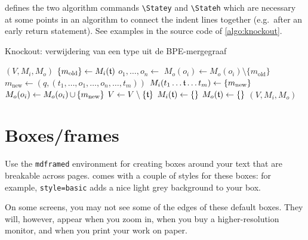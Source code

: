 \repo defines the two algorithm commands \verb|\Statey| and \verb|\Stateh| which are necessary at some points in an algorithm to connect the indent lines together (e.g.\ after an early return statement). See examples in the source code of \autoref{algo:knockout}.
\begin{algorithm}[H]
	\caption{Knockout: verwijdering van een type uit de BPE-mergegraaf}
	\label{algo:knockout}
	\begin{algorithmic}[1]
			 
				\State\Return $(V, M_i, M_o)$
			\EndIf
			\Statey $\{m_\text{old}\} \gets M_i(\mathfrak{t})$
			\State $o_1,\hdots, o_n \gets$ 
				\State $M_o(o_i) \gets M_o(o_i) \setminus \{m_\text{old}\}$  
			\EndFor \vspace{-0.22em}
				\State $m_\text{new} \gets (q, (t_1,\hdots, o_1, \hdots, o_n, \hdots, t_m))$
				\State $M_i(t_1\hdots \mathfrak{t} \hdots t_m) \gets \{m_\text{new}\}$  
					\State $M_o(o_i) \gets M_o(o_i) \operatorname{\cup}\, \{m_\text{new}\}$  
				\EndFor
			\EndFor
			\Statey $V \gets V \setminus \{\mathfrak{t}\}$
			\State $M_i(\mathfrak{t}) \gets \{\}$
			\State $M_o(\mathfrak{t}) \gets \{\}$
			\State \Return $(V, M_i, M_o)$
		\EndFunction
	\end{algorithmic}
\end{algorithm}


\section{Boxes/frames}
Use the \verb|mdframed| environment for creating boxes around your text that are breakable across pages. \repo comes with a couple of styles for these boxes: for example, \verb|style=basic| adds a nice light grey background to your box.

\begin{mdframed}[frametitle={A note about screens}, style=basic,  innertopmargin=0.7em]
	On some screens, you may not see some of the edges of these default boxes. They will, however, appear when you zoom in, when you buy a higher-resolution monitor, and when you print your work on paper.
\end{mdframed}

